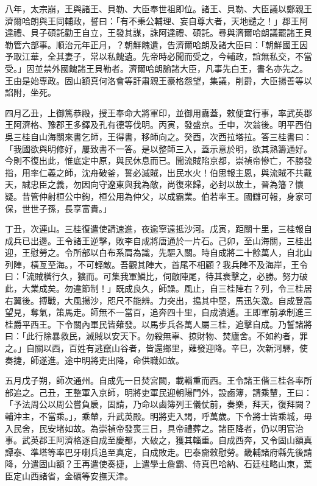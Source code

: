 \begin{pinyinscope}
八年，太宗崩，王與諸王、貝勒、大臣奉世祖即位。諸王、貝勒、大臣議以鄭親王濟爾哈朗與王同輔政，誓曰：「有不秉公輔理、妄自尊大者，天地譴之！」郡王阿達禮、貝子碩託勸王自立，王發其謀，誅阿達禮、碩託。尋與濟爾哈朗議罷諸王貝勒管六部事。順治元年正月，？朝鮮餽遺，告濟爾哈朗及諸大臣曰：「朝鮮國王因予取江華，全其妻子，常以私餽遺。先帝時必聞而受之，今輔政，誼無私交，不當受。」因並禁外國餽諸王貝勒者。濟爾哈朗諭諸大臣，凡事先白王，書名亦先之。王由是始專政。固山額真何洛會等訐肅親王豪格怨望，集議，削爵，大臣揚善等以諂附，坐死。

四月乙丑，上御篤恭殿，授王奉命大將軍印，並御用纛蓋，敕便宜行事，率武英郡王阿濟格、豫郡王多鐸及孔有德等伐明。丙寅，發盛京。壬申，次翁後。明平西伯吳三桂自山海關來書乞師，王得書，移師向之。癸酉，次西拉塔拉。答三桂書曰：「我國欲與明修好，屢致書不一答。是以整師三入，蓋示意於明，欲其熟籌通好。今則不復出此，惟底定中原，與民休息而已。聞流賊陷京都，崇禎帝慘亡，不勝發指，用率仁義之師，沈舟破釜，誓必滅賊，出民水火！伯思報主恩，與流賊不共戴天，誠忠臣之義，勿因向守遼東與我為敵，尚復來歸，必封以故土，晉為籓？懷疑。昔管仲射桓公中鉤，桓公用為仲父，以成霸業。伯若率王。國讎可報，身家可保，世世子孫，長享富貴。」

丁丑，次連山。三桂復遣使請速進，夜逾寧遠抵沙河。戊寅，距關十里，三桂報自成兵已出邊。王令諸王逆擊，敗李自成將唐通於一片石。己卯，至山海關，三桂出迎，王慰勞之。令所部以白布系肩為識，先驅入關。時自成將二十餘萬人，自北山列陣，橫亙至海。，不可輕敵。吾觀其陣大，首尾不相顧？我兵陣不及海岸，王令曰：「流賊橫行久，獷而。可集我軍鱗比，伺敵陣尾，待其衰擊之，必勝。努力破此，大業成矣。勿違節制！」既成良久，師譟。風止，自三桂陣右？列，令三桂居右翼後。搏戰，大風揚沙，咫尺不能辨。力突出，搗其中堅，馬迅矢激。自成登高望見，奪氣，策馬走。師無不一當百，追奔四十里，自成潰遁。王即軍前承制進三桂爵平西王。下令關內軍民皆薙發。以馬步兵各萬人屬三桂，追擊自成。乃誓諸將曰：「此行除暴救民，滅賊以安天下。勿殺無辜、掠財物、焚廬舍。不如約者，罪之。」自關以西，百姓有逃竄山谷者，皆還鄉里，薙發迎降。辛巳，次新河驛，使奏捷，師遂進。途中明將吏出降，命供職如故。

五月戊子朔，師次通州。自成先一日焚宮闕，載輜重而西。王令諸王偕三桂各率所部追之。己丑，王整軍入京師，明將吏軍民迎朝陽門外，設鹵簿，請乘輦，王曰：「予法周公以周公嘗負扆，固請，乃命以鹵簿列王儀仗前，奏樂，拜天，復拜闕？輔沖主，不當乘。」，乘輦，升武英殿。明將吏入謁，呼萬歲。下令將士皆乘城，毋入民舍，民安堵如故。為崇禎帝發喪三日，具帝禮葬之。諸臣降者，仍以明官治事。武英郡王阿濟格逐自成至慶都，大破之，獲其輜重。自成西奔，又令固山額真譚泰、準塔等率巴牙喇兵追至真定，自成敗走。巴泰齎敕慰勞。畿輔諸府縣先後請降，分遣固山額？王再遣使奏捷，上遣學士詹霸、侍真巴哈納、石廷柱略山東，葉臣定山西諸省，金礪等安撫天津。


\end{pinyinscope}
